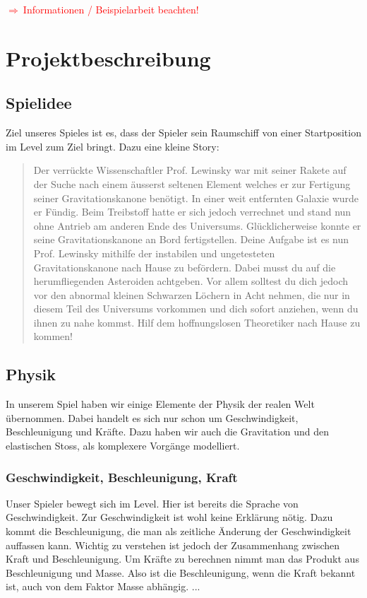 \documentclass[12pt,a4paper]{scrartcl}
\newcommand{\todo}[1]{\begin{Large}\textcolor{red}{$\Rightarrow ~$#1}\end{Large}}
\begin{document}


\clearpage

\tableofcontents

\clearpage

\todo{Informationen / Beispielarbeit beachten!}

\section{Projektbeschreibung}
\subsection{Spielidee}
Ziel unseres Spieles ist es, dass der Spieler sein Raumschiff von einer Startposition im Level
zum Ziel bringt. Dazu eine kleine Story:
\begin{quote}
Der verrückte Wissenschaftler Prof. Lewinsky war mit seiner Rakete auf der Suche nach einem äusserst seltenen Element welches er zur Fertigung seiner Gravitationskanone benötigt. 
In einer weit entfernten Galaxie wurde er Fündig. 
Beim Treibstoff hatte er sich jedoch verrechnet und stand nun ohne Antrieb am anderen Ende des Universums.
Glücklicherweise konnte er seine Gravitationskanone an Bord fertigstellen.
Deine Aufgabe ist es nun Prof. Lewinsky mithilfe der instabilen und ungetesteten Gravitationskanone nach Hause zu befördern. 
Dabei musst du auf die herumfliegenden Asteroiden achtgeben. 
Vor allem solltest du dich jedoch vor den abnormal kleinen Schwarzen Löchern in Acht nehmen, die nur in diesem Teil des Universums vorkommen und dich sofort anziehen, wenn du ihnen zu nahe kommst. 
Hilf dem hoffnungslosen Theoretiker nach Hause zu kommen!
\end{quote}

\subsection{Physik}
In unserem Spiel haben wir einige Elemente der Physik der realen Welt übernommen.
Dabei handelt es sich nur schon um Geschwindigkeit, Beschleunigung und Kräfte.
Dazu haben wir auch die Gravitation und den elastischen Stoss, als komplexere Vorgänge modelliert.
\subsubsection{Geschwindigkeit, Beschleunigung, Kraft}
Unser Spieler bewegt sich im Level.
Hier ist bereits die Sprache von Geschwindigkeit.
Zur Geschwindigkeit ist wohl keine Erklärung nötig.
Dazu kommt die Beschleunigung, die man als zeitliche Änderung der Geschwindigkeit auffassen kann.
Wichtig zu verstehen ist jedoch der Zusammenhang zwischen Kraft und Beschleunigung.
Um Kräfte zu berechnen nimmt man das Produkt aus Beschleunigung und Masse.
Also ist die Beschleunigung, wenn die Kraft bekannt ist, auch von dem Faktor Masse abhängig. ...
\end{document}
